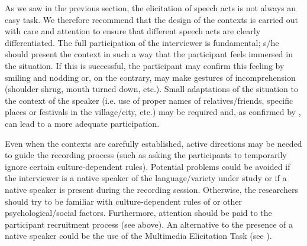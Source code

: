 \documentclass[output=paper]{LSP/langsci}
\begin{document}
As we saw in the previous section, the elicitation of speech acts is not always an easy task. We therefore recommend that the design of the contexts is carried out with care and attention to ensure that different speech acts are clearly differentiated. The full participation of the interviewer is fundamental; s/he should present the context in such a way that the participant feels immersed in the situation. If this is successful, the participant may confirm this feeling by smiling and nodding or, on the contrary, may make gestures of incomprehension (shoulder shrug, mouth turned down, etc.). Small adaptations of the situation to the context of the speaker (i.e. use of proper names of relatives/friends, specific places or festivals in the village/city, etc.) may be required and, as confirmed by \citet{Billmyer2000}, can lead to a more adequate participation.

Even when the contexts are carefully established, active directions may be needed to guide the recording process (such as asking the par\-ti\-ci\-pants to temporarily ignore certain culture-dependent rules). Potential problems could be avoided if the interviewer is a native speaker of the language/variety under study or if a native speaker is present during the recording session. Otherwise, the researchers should try to be familiar with culture-dependent rules of  or other psychological/social factors. Furthermore, attention should be paid to the participant recruitment process (see above). An alternative to the presence of a native speaker could be the use of the Multimedia Elicitation Task (see \citealt{Schauer2004}).
\end{document}
